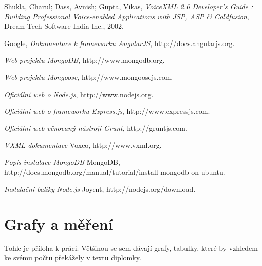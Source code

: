 \documentclass[ing,male,java,dept460]{diploma}						%
\begin{document}
\begin{thebibliography}{99}

 Shukla, Charul; Dass, Avnish; Gupta, Vikas,
\textit{VoiceXML 2.0 Developer's Guide : Building Professional Voice-enabled Applications with JSP, ASP & Coldfusion}, Dream Tech Software India Inc., 2002.

 Google,
\textit{Dokumentace k frameworku AngularJS}, http://docs.angularjs.org.

\textit{Web projektu MongoDB}, http://www.mongodb.org.

\textit{Web projektu Mongoose}, http://www.mongoosejs.com.

\textit{Oficiální web o Node.js}, http://www.nodejs.org.

\textit{Oficiální web o frameworku Express.js}, http://www.expressjs.com.

\textit{Oficiální web věnovaný nástroji Grunt}, http://gruntjs.com.

\textit{VXML dokumentace} Voxeo, http://www.vxml.org.

\textit{Popis instalace MongoDB} MongoDB, http://docs.mongodb.org/manual/tutorial/install-mongodb-on-ubuntu.

\textit{Instalační balíky Node.js} Joyent, http://nodejs.org/download.


\end{thebibliography}

\appendix
\section{Grafy a měření}
Tohle je příloha k práci. Většinou se sem dávají grafy, tabulky, které by vzhledem
ke svému počtu překážely v textu diplomky.
\clearpage
\end{document}
